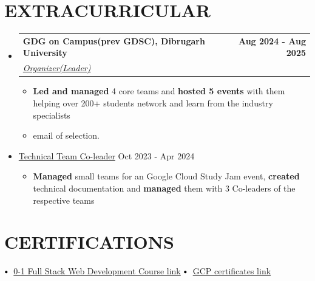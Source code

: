 \documentclass[a4paper,11pt]{article}
\makeatletter
\newcommand{\resumeItem}[1]{
    \item\small{
            {#1 \vspace{-2pt}}
        }
    }
\newcommand{\resumeSubheading}[4]{
        \vspace{-2pt}\item
        \begin{tabular*}{1.0\textwidth}[t]{l@{\extracolsep{\fill}}r}
            \textbf{\large#1} & \textbf{\small #2} \\
            \textit{\large#3} & \textit{\small #4} \\

        \end{tabular*}\vspace{-7pt}
    }
\newcommand{\resumeSubHeadingListStart}{\begin{itemize}[leftmargin=0.0in, label={}]}
\newcommand{\resumeSubHeadingListEnd}{\end{itemize}}
\newcommand{\resumeItemListStart}{\begin{itemize}}
\newcommand{\resumeItemListEnd}{\end{itemize}\vspace{-5pt}}
\newcommand\sbullet[1][.5]{\mathbin{\vcenter{\hbox{\scalebox{#1}{$\bullet$}}}}}
\makeatother
\begin{document}
\section{EXTRACURRICULAR}
\resumeSubHeadingListStart
\resumeSubheading{GDG on Campus(prev GDSC), Dibrugarh University\href{https://gdg.community.dev/gdg-on-campus-dibrugarh-university-dibrugarh-india/}{\raisebox{-0.1\height}\faExternalLink}}{Aug 2024 - Aug 2025}{\underline{Organizer(Leader)}}{}
\resumeItemListStart
\resumeItem{\normalsize{\textbf{Led and managed} 4 core teams and \textbf{hosted 5 events} with them helping over 200+ students network and learn from the industry specialists}}
\resumeItem{\normalsize{email of selection.\href{https://www.linkedin.com/in/milinda-barua/overlay/1739075889047/single-media-viewer/?profileId=ACoAAEPBtm4B6hu2mxVjWHK1bhmW2EnUnVz3F6k}{\raisebox{0 \height}\faExternalLink}}}
\resumeItemListEnd
\resumeItem{\normalsize{\underline{Technical Team Co-leader} \hfill Oct 2023 - Apr 2024}}
\resumeItemListStart
\resumeItem{\normalsize{\textbf{Managed} small teams for an Google Cloud Study Jam event, \textbf{created} technical documentation and \textbf{managed} them with 3 Co-leaders of the respective teams}}
\resumeItemListEnd
\resumeSubHeadingListEnd
\vspace{-11pt}

\section{CERTIFICATIONS}

$\sbullet[.75] \hspace{0.1cm}$ \href{https://drive.google.com/file/d/1EH_jUK-UUidX4LybD7Xez974SCDGPA1C/view?usp=sharing}{0-1 Full Stack Web Development Course link} \hspace{1.6cm}
$\sbullet[.75] \hspace{0.1cm}$ {\href{https://www.cloudskillsboost.google/public_profiles/d88db451-eb32-437f-8c4a-39f9006e991e}{GCP certificates \color{blue}link}} \hspace{2.59cm} \\
\end{document}
